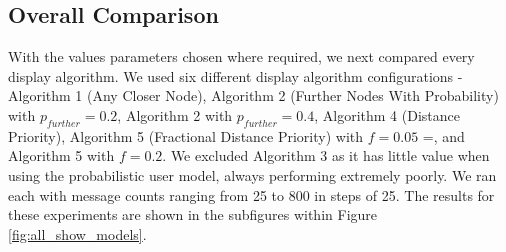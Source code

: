 \documentclass[bsc,frontabs,twoside,singlespacing,parskip,deptreport]{infthesis}     %
\begin{document}
\subsection{Overall Comparison} \label{subsec:all_show_models_results}
With the values parameters chosen where required, we next compared every display algorithm. We used six different display algorithm configurations - Algorithm 1 (Any Closer Node), Algorithm 2 (Further Nodes With Probability) with $p_{further}=0.2$, Algorithm 2 with $p_{further}=0.4$, Algorithm 4 (Distance Priority), Algorithm 5 (Fractional Distance Priority) with $f=0.05$ =, and Algorithm 5 with $f=0.2$. We excluded Algorithm 3 as it has little value when using the probabilistic user model, always performing extremely poorly. We ran each with message counts ranging from 25 to 800 in steps of 25. The results for these experiments are shown in the subfigures within Figure \ref{fig:all_show_models}.
\end{document}
